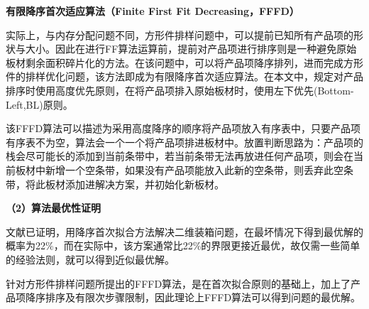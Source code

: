 \documentclass[bwprint]{gmcmthesis}
\begin{document}
    \textbf{有限降序首次适应算法（Finite First Fit Decreasing，FFFD）}	
    
    实际上，与内存分配问题不同，方形件排样问题中，可以提前已知所有产品项的形状与大小。因此在进行FF算法运算前，提前对产品项进行排序则是一种避免原始板材剩余面积碎片化的方法。在该问题中，可以将产品项降序排列，进而完成方形件的排样优化问题，该方法即成为有限降序首次适应算法。在本文中，规定对产品排序时使用高度优先原则，在将产品项排入原始板材时，使用左下优先(Bottom-Left,BL)原则。

    该FFFD算法可以描述为采用高度降序的顺序将产品项放入有序表中，只要产品项有序表不为空，算法会一个一个将产品项排进板材中。放置判断思路为：产品项的栈会尽可能长的添加到当前条带中，若当前条带无法再放进任何产品项，则会在当前板材中新增一个空条带，如果没有产品项能放入此新的空条带，则丢弃此空条带，将此板材添加进解决方案，并初始化新板材。

    \textbf{（2）算法最优性证明 }	
	
	文献\cite{FFFD}已证明，用降序首次拟合方法解决二维装箱问题，在最坏情况下得到最优解的概率为22\%，而在实际中，该方案通常比22\%的界限更接近最优，故仅需一些简单的经验法则，就可以得到近似最优解。
	
	
	针对方形件排样问题所提出的FFFD算法，是在首次拟合原则的基础上，加上了产品项降序排序及有限次步骤限制，因此理论上FFFD算法可以得到问题的最优解。

	
	
	
	
	
\end{document}
